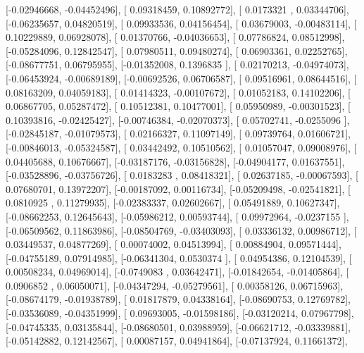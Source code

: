 \documentclass{article}
\begin{document}
       [-0.02946668, -0.04452496],
       [ 0.09318459,  0.10892772],
       [ 0.0173321 ,  0.03344706],
       [-0.06235657,  0.04820519],
       [ 0.09933536,  0.04156454],
       [ 0.03679003, -0.00483114],
       [ 0.10229889,  0.06928078],
       [ 0.01370766, -0.04036653],
       [ 0.07786824,  0.08512998],
       [-0.05284096,  0.12842547],
       [ 0.07980511,  0.09480274],
       [ 0.06903361,  0.02252765],
       [-0.08677751,  0.06795955],
       [-0.01352008,  0.1396835 ],
       [ 0.02170213, -0.04974073],
       [-0.06453924, -0.00689189],
       [-0.00692526,  0.06706587],
       [ 0.09516961,  0.08644516],
       [ 0.08163209,  0.04059183],
       [ 0.01414323, -0.00107672],
       [ 0.01052183,  0.14102206],
       [ 0.06867705,  0.05287472],
       [ 0.10512381,  0.10477001],
       [ 0.05950989, -0.00301523],
       [ 0.10393816, -0.02425427],
       [-0.00746384, -0.02070373],
       [ 0.05702741, -0.0255096 ],
       [-0.02845187, -0.01079573],
       [ 0.02166327,  0.11097149],
       [ 0.09739764,  0.01606721],
       [-0.00846013, -0.05324587],
       [ 0.03442492,  0.10510562],
       [ 0.01057047,  0.09008976],
       [ 0.04405688,  0.10676667],
       [-0.03187176, -0.03156828],
       [-0.04904177,  0.01637551],
       [-0.03528896, -0.03756726],
       [ 0.0183283 ,  0.08418321],
       [ 0.02637185, -0.00067593],
       [ 0.07680701,  0.13972207],
       [-0.00187092,  0.00116734],
       [-0.05209498, -0.02541821],
       [ 0.0810925 ,  0.11279935],
       [-0.02383337,  0.02602667],
       [ 0.05491889,  0.10627347],
       [-0.08662253,  0.12645643],
       [-0.05986212,  0.00593744],
       [ 0.09972964, -0.0237155 ],
       [-0.06509562,  0.11863986],
       [-0.08504769, -0.03403093],
       [ 0.03336132,  0.00986712],
       [ 0.03449537,  0.04877269],
       [ 0.00074002,  0.04513994],
       [ 0.00884904,  0.09571444],
       [-0.04755189,  0.07914985],
       [-0.06341304,  0.0530374 ],
       [ 0.04954386,  0.12104539],
       [ 0.00508234,  0.04969014],
       [-0.0749083 ,  0.03642471],
       [-0.01842654, -0.01405864],
       [ 0.0906852 ,  0.06050071],
       [-0.04347294, -0.05279561],
       [ 0.00358126,  0.06715963],
       [-0.08674179, -0.01938789],
       [ 0.01817879,  0.04338164],
       [-0.08690753,  0.12769782],
       [-0.03536089, -0.04351999],
       [ 0.09693005, -0.01598186],
       [-0.03120214,  0.07967798],
       [-0.04745335,  0.03135844],
       [-0.08680501,  0.03988959],
       [-0.06621712, -0.03339881],
       [-0.05142882,  0.12142567],
       [ 0.00087157,  0.04941864],
       [-0.07137924,  0.11661372],
\end{document}

